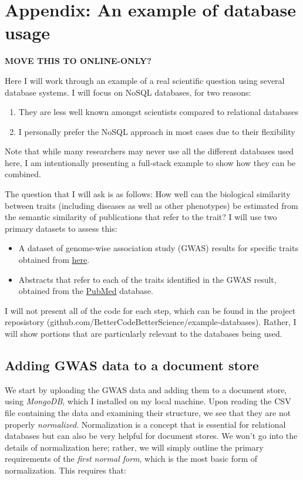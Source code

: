 \section{Appendix: An example of database usage}

\textbf{MOVE THIS TO ONLINE-ONLY?}

Here I will work through an example of a real scientific question using several database systems. I will focus on NoSQL databases, for two reasons:

\begin{enumerate}
\item They are less well known amongst scientists compared to relational databases
\item I personally prefer the NoSQL approach in most cases due to their flexibility
\end{enumerate}

Note that while many researchers may never use all the different databases used here, I am intentionally presenting a full-stack example to show how they can be combined.

The question that I will ask is as follows: How well can the biological similarity between traits (including diseases as well as other phenotypes) be estimated from the semantic similarity of publications that refer to the trait?  I will use two primary datasets to assess this:

\begin{itemize}
\item A dataset of genome-wise association study (GWAS) results for specific traits obtained from \href{https://www.ebi.ac.uk/gwas/docs/file-downloads}{here}.
\item Abstracts that refer to each of the traits identified in the GWAS result, obtained from the \href{https://pubmed.ncbi.nlm.nih.gov/}{PubMed} database.
\end{itemize}

I will not present all of the code for each step, which can be found in the project reposistory (github.com/BetterCodeBetterScience/example-databases). Rather, I will show portions that are particularly relevant to the databases being used.

\subsection{Adding GWAS data to a document store}

We start by uploading the GWAS data and adding them to a document store, using \textit{MongoDB}, which I installed on my local machine.   Upon reading the CSV file containing the data and examining their structure, we see that they are not properly \textit{normalized}. Normalization is a concept that is essential for relational databases but can also be very helpful for document stores.  We won't go into the details of normalization here; rather, we will simply outline the primary requirements of the \textit{first normal form}, which is the most basic form of normalization.  This requires that:

